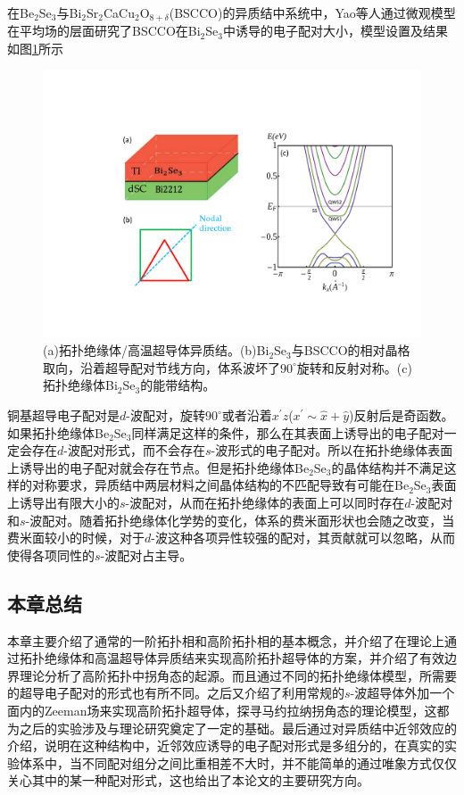  在Be$_2$Se$_3$与Bi$_2$Sr$_2$CaCu$_2$O$_{8+\delta}$(BSCCO)的异质结中系统中，Yao等人\cite{re48}通过微观模型在平均场的层面研究了BSCCO在Bi$_2$Se$_3$中诱导的电子配对大小，模型设置及结果如图\ref{fig14}所示
\begin{figure}[h]
	\centering
	\includegraphics[scale=0.7]{pic/fig15.pdf}
	\caption{(a)拓扑绝缘体/高温超导体异质结。(b)Bi$_2$Se$_3$与BSCCO的相对晶格取向，沿着超导配对节线方向，体系波坏了$90^\circ$旋转和反射对称。(c)拓扑绝缘体Bi$_2$Se$_3$的能带结构\cite{re48}。}\label{fig14}
\end{figure}
铜基超导电子配对是$d$-波配对，旋转$90^\circ$或者沿着$x^{'}z$($x^{'}\sim \hat{x}+\hat{y}$)反射后是奇函数。如果拓扑绝缘体Be$_2$Se$_3$同样满足这样的条件，那么在其表面上诱导出的电子配对一定会存在$d$-波配对形式，而不会存在$s$-波形式的电子配对。所以在拓扑绝缘体表面上诱导出的电子配对就会存在节点。但是拓扑绝缘体Be$_2$Se$_3$的晶体结构并不满足这样的对称要求，异质结中两层材料之间晶体结构的不匹配导致有可能在Be$_2$Se$_3$表面上诱导出有限大小的$s$-波配对，从而在拓扑绝缘体的表面上可以同时存在$d$-波配对和$s$-波配对。随着拓扑绝缘体化学势的变化，体系的费米面形状也会随之改变，当费米面较小的时候，对于$d$-波这种各项异性较强的配对，其贡献就可以忽略，从而使得各项同性的$s$-波配对占主导。
\subsection{本章总结}
 本章主要介绍了通常的一阶拓扑相和高阶拓扑相的基本概念，并介绍了在理论上通过拓扑绝缘体和高温超导体异质结来实现高阶拓扑超导体的方案，并介绍了有效边界理论分析了高阶拓扑中拐角态的起源。而且通过不同的拓扑绝缘体模型，所需要的超导电子配对的形式也有所不同。之后又介绍了利用常规的$s$-波超导体外加一个面内的Zeeman场来实现高阶拓扑超导体，探寻马约拉纳拐角态的理论模型，这都为之后的实验涉及与理论研究奠定了一定的基础。最后通过对异质结中近邻效应的介绍，说明在这种结构中，近邻效应诱导的电子配对形式是多组分的，在真实的实验体系中，当不同配对组分之间比重相差不大时，并不能简单的通过唯象方式仅仅关心其中的某一种配对形式，这也给出了本论文的主要研究方向。










